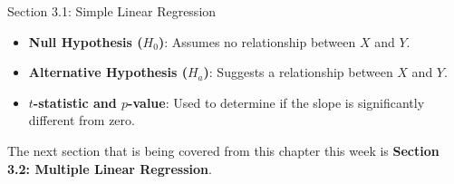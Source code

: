 \begin{notes}{Section 3.1: Simple Linear Regression}
    \begin{highlight}
        \begin{itemize}
            \item \textbf{Null Hypothesis ($H_0$)}: Assumes no relationship between $X$ and $Y$.
            \item \textbf{Alternative Hypothesis ($H_a$)}: Suggests a relationship between $X$ and $Y$.
            \item \textbf{$t$-statistic and $p$-value}: Used to determine if the slope is significantly different from zero.
        \end{itemize}
    \end{highlight}
\end{notes}

The next section that is being covered from this chapter this week is \textbf{Section 3.2: Multiple Linear Regression}.

